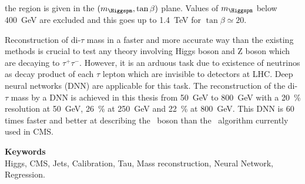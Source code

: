 the region is given in the $(m_{\Higgspm},\tan\beta)$ plane.
Values of $m_{\Higgspm}$ below \SI{400}{\GeV} are excluded
and this goes up to 
\SI{1.4}{\TeV} for $\tan\beta\simeq\num{20}$.
\par
Reconstruction of di-$\tau$ mass in a faster and more accurate way than the existing methods is crucial to test any theory involving Higgs boson and Z boson which are decaying to $\tau^+ \tau^-$. 
However, it is an arduous task due to existence of neutrinos as decay product of each $\tau$ lepton which are invisible to detectors at LHC. 
Deep neural networks (DNN) are applicable for this task. 
The reconstruction of the di-$\tau$ mass by a DNN
is achieved in this thesis
from 
\SI{50}{\GeV} to \SI{800}{\GeV}
with a
\SI{20}{\%} resolution at \SI{50}{\GeV},
\SI{26}{\%} at \SI{250}{\GeV} and
\SI{22}{\%} at \SI{800}{\GeV}.
This DNN is
60 times faster
and
better at describing the \Zboson~boson
than the \SVFIT\ algorithm currently used in CMS.

\vfill

\noindent\textbf{\Large\sffamily Keywords}\\
Higgs,
CMS,
Jets,
Calibration,
Tau,
Mass reconstruction,
Neural Network,
Regression.

\vspace{2\baselineskip}